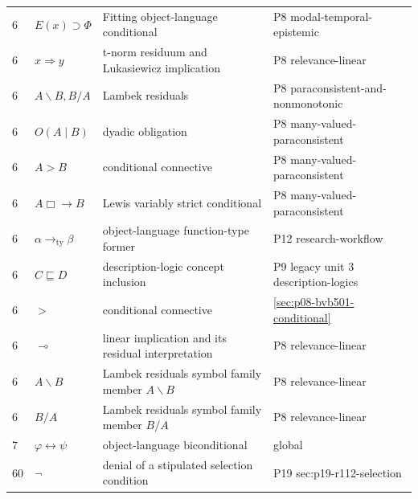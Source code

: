 \begin{longtable}{@{}p{}p{}p{}p{}@{}}
6 & \(E(x)\supset\Phi\) & Fitting object-language conditional & P8 modal-temporal-epistemic \\
6 & \(x\Rightarrow y\) & t-norm residuum and Lukasiewicz implication & P8 relevance-linear \\
6 & \(A\backslash B,B/A\) & Lambek residuals & P8 paraconsistent-and-nonmonotonic \\
6 & \(O(A\mid B)\) & dyadic obligation & P8 many-valued-paraconsistent \\
6 & \(A>B\) & conditional connective & P8 many-valued-paraconsistent \\
6 & \(A\Box\!\!\to B\) & Lewis variably strict conditional & P8 many-valued-paraconsistent \\
6 & \(\alpha\to_{\mathrm{ty}}\beta\) & object-language function-type former & P12 research-workflow \\
6 & \(C\sqsubseteq D\) & description-logic concept inclusion & P9 legacy unit 3 description-logics \\
6 & \(>\) & conditional connective & \hyperref[sec:p08-bvb501-conditional]{\ref*{sec:p08-bvb501-conditional}} \\
6 & \(\multimap\) & linear implication and its residual interpretation & P8 relevance-linear \\
6 & \(A\backslash B\) & Lambek residuals symbol family member \(A\backslash B\) & P8 relevance-linear \\
6 & \(B/A\) & Lambek residuals symbol family member \(B/A\) & P8 relevance-linear \\
7 & \(\varphi\leftrightarrow\psi\) & object-language biconditional & global \\
60 & \(\neg\) & denial of a stipulated selection condition & P19 sec:p19-r112-selection \\
\end{longtable}
\endgroup
